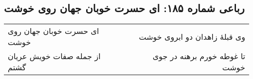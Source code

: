 \begin{center}
\section*{رباعی شماره ۱۸۵: ای حسرت خوبان جهان روی خوشت}
\label{sec:0185}
\begin{longtable}{l p{0.5cm} r}
ای حسرت خوبان جهان روی خوشت
&&
وی قبلهٔ زاهدان دو ابروی خوشت
\\
از جمله صفات خویش عریان گشتم
&&
تا غوطه خورم برهنه در جوی خوشت
\\
\end{longtable}
\end{center}
